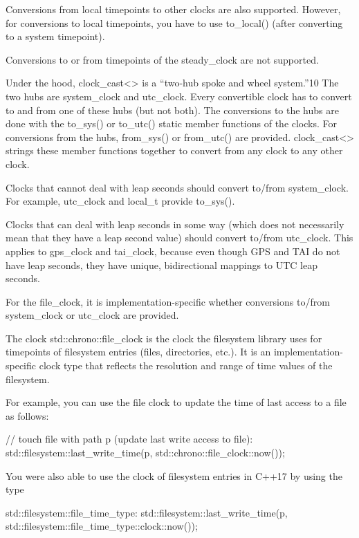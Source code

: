 Conversions from local timepoints to other clocks are also supported. However, for conversions to local timepoints, you have to use to\_local() (after converting to a system timepoint).

Conversions to or from timepoints of the steady\_clock are not supported.


Under the hood, clock\_cast<> is a “two-hub spoke and wheel system.”10 The two hubs are system\_clock and utc\_clock. Every convertible clock has to convert to and from one of these hubs (but not both). The conversions to the hubs are done with the to\_sys() or to\_utc() static member functions of the clocks. For conversions from the hubs, from\_sys() or from\_utc() are provided. clock\_cast<> strings these member functions together to convert from any clock to any other clock.

Clocks that cannot deal with leap seconds should convert to/from system\_clock. For example, utc\_clock and local\_t provide to\_sys().

Clocks that can deal with leap seconds in some way (which does not necessarily mean that they have a leap second value) should convert to/from utc\_clock. This applies to gps\_clock and tai\_clock, because even though GPS and TAI do not have leap seconds, they have unique, bidirectional mappings to UTC leap seconds.

For the file\_clock, it is implementation-specific whether conversions to/from system\_clock or utc\_clock are provided.



The clock std::chrono::file\_clock is the clock the filesystem library uses for timepoints of filesystem entries (files, directories, etc.). It is an implementation-specific clock type that reflects the resolution and range of time values of the filesystem.

For example, you can use the file clock to update the time of last access to a file as follows:

\begin{cpp}
// touch file with path p (update last write access to file):
std::filesystem::last_write_time(p,
								 std::chrono::file_clock::now());
\end{cpp}

You were also able to use the clock of filesystem entries in C++17 by using the type

\begin{cpp}
std::filesystem::file_time_type:
	std::filesystem::last_write_time(p,
									std::filesystem::file_time_type::clock::now());
\end{cpp}

